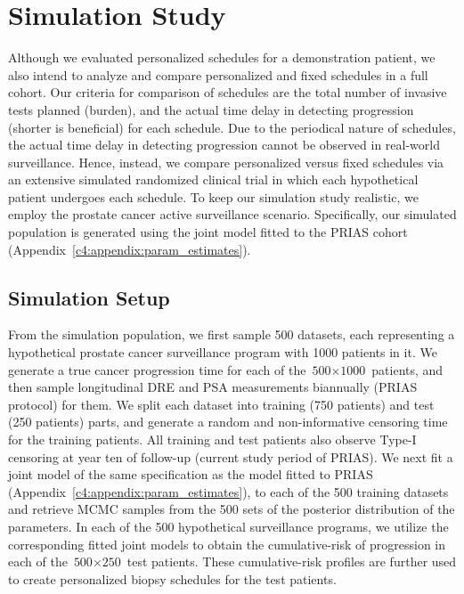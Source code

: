\section{Simulation Study}
\label{c4:sec:sim_study}
Although we evaluated personalized schedules for a demonstration patient, we also intend to analyze and compare personalized and fixed schedules in a full cohort. Our criteria for comparison of schedules are the total number of invasive tests planned (burden), and the actual time delay in detecting progression (shorter is beneficial) for each schedule. Due to the periodical nature of schedules, the actual time delay in detecting progression cannot be observed in real-world surveillance. Hence, instead, we compare personalized versus fixed schedules via an extensive simulated randomized clinical trial in which each hypothetical patient undergoes each schedule. To keep our simulation study realistic, we employ the prostate cancer active surveillance scenario. Specifically, our simulated population is generated using the joint model fitted to the PRIAS cohort (Appendix~\ref{c4:appendix:param_estimates}).

\subsection{Simulation Setup}
From the simulation population, we first sample 500 datasets, each representing a hypothetical prostate cancer surveillance program with 1000 patients in it. We generate a true cancer progression time for each of the ${\mbox{500} \times \mbox{1000}}$ patients, and then sample longitudinal DRE and PSA measurements biannually (PRIAS protocol) for them. We split each dataset into training (750 patients) and test (250 patients) parts, and generate a random and non-informative censoring time for the training patients. All training and test patients also observe Type-I censoring at year ten of follow-up (current study period of PRIAS). We next fit a joint model of the same specification as the model fitted to PRIAS (Appendix~\ref{c4:appendix:param_estimates}), to each of the 500 training datasets and retrieve MCMC samples from the 500 sets of the posterior distribution of the parameters. In each of the 500 hypothetical surveillance programs, we utilize the corresponding fitted joint models to obtain the cumulative-risk of progression in each of the ${\mbox{500} \times \mbox{250}}$ test patients. These cumulative-risk profiles are further used to create personalized biopsy schedules for the test patients. 

